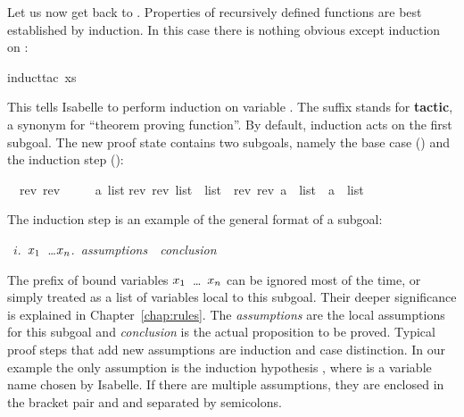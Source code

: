 \begin{isabellebody}
\begin{isamarkuptxt}
Let us now get back to . Properties of recursively
defined functions are best established by induction. In this case there is
nothing obvious except induction on :%
\end{isamarkuptxt}%
\isamarkuptrue%
\isamarkupfalse%
{\isacharparenleft}induct{\isacharunderscore}tac\ xs{\isacharparenright}%
\begin{isamarkuptxt}%
\noindent{}%
This tells Isabelle to perform induction on variable . The suffix
 stands for \textbf{tactic},
a synonym for ``theorem proving function''.
By default, induction acts on the first subgoal. The new proof state contains
two subgoals, namely the base case () and the induction step
():
\begin{isabelle}%
\ {}{\isachardot}\ rev\ {\isacharparenleft}rev\ {\isacharbrackleft}{\isacharbrackright}{\isacharparenright}\ {\isacharequal}\ {\isacharbrackleft}{\isacharbrackright}\isanewline
\ {}{\isachardot}\ {\isasymAnd}a\ list{\isachardot}\isanewline
{}rev\ {\isacharparenleft}rev\ list{\isacharparenright}\ {\isacharequal}\ list\ {\isasymLongrightarrow}\ rev\ {\isacharparenleft}rev\ {\isacharparenleft}a\ {\isacharhash}\ list{\isacharparenright}{\isacharparenright}\ {\isacharequal}\ a\ {\isacharhash}\ list%
\end{isabelle}

The induction step is an example of the general format of a subgoal:
\begin{isabelle}
~$i$.~{\isasymAnd}$x\sb{1}$~\dots$x\sb{n}$.~{\it assumptions}~{\isasymLongrightarrow}~{\it conclusion}
\end{isabelle}
The prefix of bound variables \isasymAnd$x\sb{1}$~\dots~$x\sb{n}$ can be
ignored most of the time, or simply treated as a list of variables local to
this subgoal. Their deeper significance is explained in Chapter~\ref{chap:rules}.
The {\it assumptions}
are the local assumptions for this subgoal and {\it
  conclusion} is the actual proposition to be proved. 
Typical proof steps
that add new assumptions are induction and case distinction. In our example
the only assumption is the induction hypothesis , where  is a variable name chosen by Isabelle. If there
are multiple assumptions, they are enclosed in the bracket pair
 and
 and separated by semicolons.


\end{isamarkuptxt}
\end{isabellebody}
